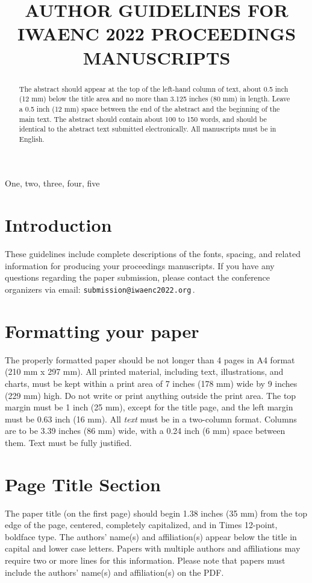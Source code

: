 \documentclass{article}
\title{AUTHOR GUIDELINES FOR IWAENC 2022 PROCEEDINGS MANUSCRIPTS}
\begin{document}
%
\maketitle
%
\begin{abstract}
The abstract should appear at the top of the left-hand column of text, about
0.5 inch (12 mm) below the title area and no more than 3.125 inches (80 mm) in
length.  Leave a 0.5 inch (12 mm) space between the end of the abstract and the
beginning of the main text.  The abstract should contain about 100 to 150
words, and should be identical to the abstract text submitted electronically.
All manuscripts must be in English.
\end{abstract}
%
\begin{keywords}
One, two, three, four, five
\end{keywords}
%
\section{Introduction}
\label{sec:intro}

These guidelines include complete descriptions of the fonts, spacing, and related information for producing your proceedings manuscripts.
If you have any questions regarding the paper submission, please contact the conference organizers via email: \texttt{submission@iwaenc2022.org}\,.

\section{Formatting your paper}
\label{sec:format}

The properly formatted paper should be not longer than 4 pages in A4 format (210 mm x 297 mm).  All printed material, including text, illustrations, and charts, must be kept within a print area of 7 inches (178 mm) wide by 9 inches (229 mm) high. Do not write or print anything outside the print area. The top margin must be 1 inch (25 mm), except for the title page, and the left margin must be 0.63 inch (16 mm).  All \textit{text} must be in a two-column format. Columns are to be 3.39 inches (86 mm) wide, with a 0.24 inch (6 mm) space between them. Text must be fully justified.

\section{Page Title Section}
\label{sec:pagestyle}

The paper title (on the first page) should begin 1.38 inches (35 mm) from the top edge of the page, centered, completely capitalized, and in Times 12-point, boldface type.  The authors' name(s) and affiliation(s) appear below the title in capital and lower case letters.  Papers with multiple authors and affiliations may require two or more lines for this information. Please note that papers must include the authors’ name(s) and affiliation(s) on the PDF.
\end{document}
